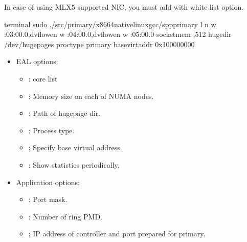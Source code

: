 \documentclass[a4paper,11pt,openany,oneside,english]{sphinxmanual}
\begin{document}
In case of using MLX5 supported NIC, you must add 
with white list option.

\begin{sphinxVerbatim}[commandchars=\\\{\},formatcom=\footnotesize]
 terminal 
 sudo ./src/primary/x86\PYGZus{}64\PYGZhy{}native\PYGZhy{}linux\PYGZhy{}gcc/spp\PYGZus{}primary 
    \PYGZhy{}l  \PYGZhy{}n  
    \PYGZhy{}w :03:00.0,dv\PYGZus{}flow\PYGZus{}en 
    \PYGZhy{}w :04:00.0,dv\PYGZus{}flow\PYGZus{}en 
    \PYGZhy{}w :05:00.0 
    \PYGZhy{}\PYGZhy{}socket\PYGZhy{}mem ,512 
    \PYGZhy{}\PYGZhy{}huge\PYGZhy{}dir /dev/hugepages 
    \PYGZhy{}\PYGZhy{}proc\PYGZhy{}type primary 
    \PYGZhy{}\PYGZhy{}base\PYGZhy{}virtaddr 0x100000000
\end{sphinxVerbatim}
\begin{itemize}
\item {} 
EAL options:
\begin{itemize}
\item {} 
: core list

\item {} 
: Memory size on each of NUMA nodes.

\item {} 
: Path of hugepage dir.

\item {} 
: Process type.

\item {} 
: Specify base virtual address.

\item {} 
: Show statistics periodically.

\end{itemize}

\item {} 
Application options:
\begin{itemize}
\item {} 
: Port mask.

\item {} 
: Number of ring PMD.

\item {} 
: IP address of controller and port prepared for primary.

\end{itemize}

\end{itemize}
\end{document}
